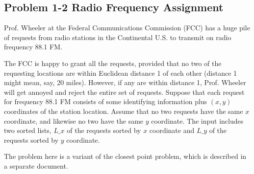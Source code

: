 \documentclass[12pt]{article}
\begin{document}
\subsection*{Problem 1-2 Radio Frequency Assignment}
\par{Prof. Wheeler at the Federal Communications Commission (FCC) has a huge pile of requests from radio stations in the Continental U.S. to transmit on radio frequency 88.1 FM.}
\par{The FCC is happy to grant all the requests, provided that no two of the requesting locations are within Euclidean distance 1 of each other (distance 1 might mean, say, 20 miles). However, if any are within distance 1, Prof. Wheeler will get annoyed and reject the entire set of requests. Suppose that each request for frequency 88.1 FM consists of some identifying information plus $(x, y)$ coordinates of the station location. Assume that no two requests have the same $x$ coordinate, and likewise no two have the same $y$ coordinate. The input includes two sorted lists, $L\_x$ of the requests sorted by $x$ coordinate and $L\_y$ of the requests sorted by $y$ coordinate.}
\par{The problem here is a variant of the closest point problem, which is described in a separate document.}
\end{document}
